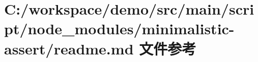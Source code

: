 \hypertarget{node__modules_2minimalistic-assert_2_r_e_a_d_m_e_8md}{}\section{C\+:/workspace/demo/src/main/script/node\+\_\+modules/minimalistic-\/assert/readme.md 文件参考}
\label{node__modules_2minimalistic-assert_2_r_e_a_d_m_e_8md}
